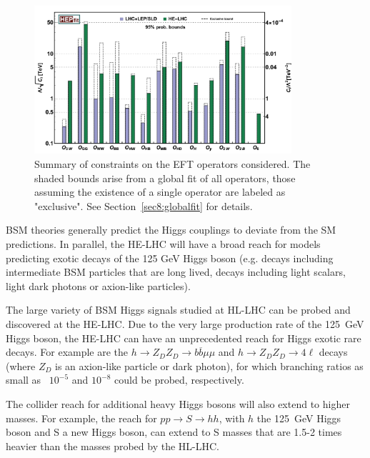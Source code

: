 \documentclass[../report.tex]{subfiles}
\begin{document}
\begin{figure}[h!]
\centering
\includegraphics[width=0.85\textwidth]{section10/img/EFT_HE-LHC.pdf}
\caption{Summary of constraints on the EFT operators considered. The shaded bounds arise from a global fit of all operators, those assuming the existence of a single operator are labeled as "exclusive". See Section~\ref{sec8:globalfit} for details.}
\label{fig:EFT}
\end{figure}
BSM theories generally predict the Higgs couplings to deviate from the SM predictions. In parallel, the HE-LHC will have a broad reach for models predicting exotic decays of the 125 GeV Higgs boson (e.g. decays including intermediate BSM particles that are long lived, decays including light scalars, light dark photons or axion-like particles). 

The large variety of BSM Higgs signals studied at HL-LHC can be probed and discovered at the HE-LHC. Due to the very large production rate of the 125~GeV Higgs boson, the HE-LHC can have an unprecedented reach for Higgs exotic rare decays. For example are the $h \rightarrow Z_D Z_D \rightarrow b\overline{b}\mu\mu$ and $h \rightarrow  Z_D Z_D \rightarrow 4\ell$ decays (where $Z_D$ is an axion-like particle or dark photon), for which branching ratios as small as ~$10^{-5}$ and $10^{-8}$ could be probed, respectively.

The collider reach for additional heavy Higgs bosons will also extend to higher masses. For example, the reach for $pp \rightarrow S \rightarrow hh$, with $h$ the 125~GeV Higgs boson and S a new Higgs boson, can extend to S masses that are 1.5-2 times heavier than the masses probed by the HL-LHC.
\end{document}
